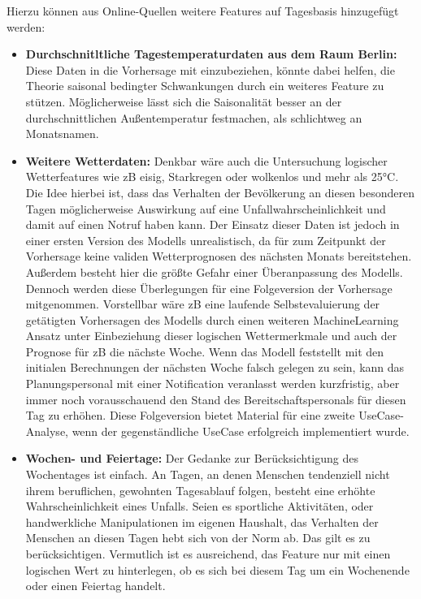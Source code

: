 Hierzu können aus Online-Quellen weitere Features auf Tagesbasis hinzugefügt werden:

\begin{itemize}
 \itemsep-8pt
 \item \textbf{Durchschnitltliche Tagestemperaturdaten aus dem Raum Berlin:} Diese Daten  in die Vorhersage mit einzubeziehen, könnte dabei helfen, die Theorie saisonal bedingter Schwankungen durch ein weiteres Feature zu stützen. Möglicherweise lässt sich die Saisonalität besser an der durchschnittlichen Außentemperatur festmachen, als schlichtweg an Monatsnamen. 
 \item \textbf{Weitere Wetterdaten:} Denkbar wäre auch die Untersuchung logischer Wetterfeatures wie zB eisig, Starkregen oder wolkenlos und mehr als 25°C. Die Idee hierbei ist, dass das Verhalten der Bevölkerung an diesen besonderen Tagen möglicherweise Auswirkung auf eine Unfallwahrscheinlichkeit und damit auf einen Notruf haben kann. Der Einsatz dieser Daten ist jedoch in einer ersten Version des Modells unrealistisch, da für zum Zeitpunkt der Vorhersage keine validen Wetterprognosen des nächsten Monats bereitstehen. Außerdem besteht hier die größte Gefahr einer Überanpassung des Modells. Dennoch werden diese Überlegungen für eine Folgeversion der Vorhersage mitgenommen. Vorstellbar wäre zB eine laufende Selbstevaluierung der getätigten Vorhersagen des Modells durch einen weiteren MachineLearning Ansatz unter Einbeziehung dieser logischen Wettermerkmale und auch der Prognose für zB die nächste Woche. Wenn das Modell feststellt mit den initialen Berechnungen der nächsten Woche falsch gelegen zu sein, kann das Planungspersonal mit einer Notification veranlasst werden kurzfristig, aber immer noch vorausschauend den Stand des Bereitschaftspersonals für diesen Tag zu erhöhen. Diese Folgeversion bietet Material für eine zweite UseCase-Analyse, wenn der gegenständliche UseCase erfolgreich implementiert wurde.
 \item \textbf{Wochen- und Feiertage:} Der Gedanke zur Berücksichtigung des Wochentages ist einfach. An Tagen, an denen Menschen tendenziell nicht ihrem beruflichen, gewohnten Tagesablauf folgen, besteht eine erhöhte Wahrscheinlichkeit eines Unfalls. Seien es sportliche Aktivitäten, oder handwerkliche Manipulationen im eigenen Haushalt, das Verhalten der Menschen an diesen Tagen hebt sich von der Norm ab. Das gilt es zu berücksichtigen. Vermutlich ist es ausreichend, das Feature nur mit einen logischen Wert zu hinterlegen, ob es sich bei diesem Tag um ein Wochenende oder einen Feiertag handelt.

\end{itemize}
